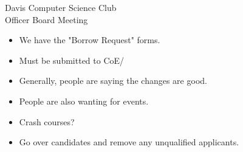 \documentclass{article}
\begin{document}
\begin{Minutes}{Davis Computer Science Club\\Officer Board Meeting}

\missingExcused{%
}





\maketitle

\begin{itemize}
   \item We have the "Borrow Request" forms.
   \item Must be submitted to CoE/
\end{itemize}

\begin{itemize}
	\item Generally, people are saying the changes are good. 
	\item People are also wanting for events.
	\item Crash courses? 
\end{itemize}

\begin{itemize}
	\item Go over candidates and remove any unqualified applicants. 
\end{itemize}

\thispagestyle{creditfooter}

\end{Minutes}
\end{document}
